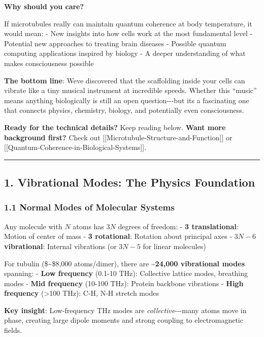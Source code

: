 \textbf{Why should you care?}

If microtubules really can maintain quantum coherence at body
temperature, it would mean: - New insights into how cells work at the
most fundamental level - Potential new approaches to treating brain
diseases - Possible quantum computing applications inspired by biology -
A deeper understanding of what makes consciousness possible

\textbf{The bottom line}: We\textquotesingle ve discovered that the
scaffolding inside your cells can vibrate like a tiny musical instrument
at incredible speeds. Whether this ``music'' means anything biologically
is still an open question-\/-\/-but it\textquotesingle s a fascinating
one that connects physics, chemistry, biology, and potentially even
consciousness.

\textbf{Ready for the technical details?} Keep reading below.
\textbf{Want more background first?} Check out
{[}{[}Microtubule-Structure-and-Function{]}{]} or
{[}{[}Quantum-Coherence-in-Biological-Systems{]}{]}.

\begin{center}\rule{0.5\linewidth}{0.5pt}\end{center}

\subsection{1. Vibrational Modes: The Physics
Foundation}\label{vibrational-modes-the-physics-foundation}

\subsubsection{1.1 Normal Modes of Molecular
Systems}\label{normal-modes-of-molecular-systems}

Any molecule with \(N\) atoms has \(3N\) degrees of freedom: - \textbf{3
translational}: Motion of center of mass - \textbf{3 rotational}:
Rotation about principal axes - \textbf{\(3N - 6\) vibrational}:
Internal vibrations (or \(3N - 5\) for linear molecules)

For tubulin (\$\sim\$8,000 atoms/dimer), there are
\textbf{\textasciitilde24,000 vibrational modes} spanning: - \textbf{Low
frequency} (0.1-10 THz): Collective lattice modes, breathing modes -
\textbf{Mid frequency} (10-100 THz): Protein backbone vibrations -
\textbf{High frequency} (\textgreater100 THz): C-H, N-H stretch modes

\textbf{Key insight}: Low-frequency THz modes are
\emph{collective}-\/-\/-many atoms move in phase, creating large dipole
moments and strong coupling to electromagnetic fields.


